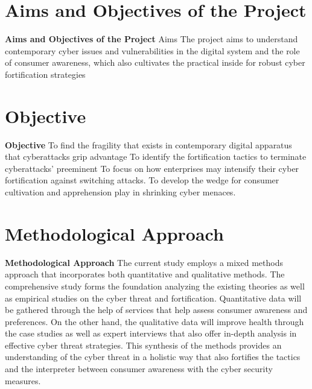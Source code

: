 
\section{Aims and Objectives of the Project}
\label{sec:into_back}
\textbf{Aims and Objectives of the Project}
Aims
The project aims to understand contemporary cyber issues and vulnerabilities in the digital system and the role of consumer awareness, which also cultivates the practical inside for robust cyber fortification strategies



\section{Objective}
\label{sec:into_back}
\textbf{Objective}
To find the fragility that exists in contemporary digital apparatus that cyberattacks grip advantage 
To identify the fortification tactics to terminate cyberattacks' preeminent
To focus on how enterprises may intensify their cyber fortification against switching attacks.
To develop the wedge for consumer cultivation and apprehension play in shrinking cyber menaces.



\section{Methodological Approach}
\label{sec:into_back}
\textbf{Methodological Approach}
The current study employs a mixed methods approach that incorporates both quantitative and qualitative methods. The comprehensive study forms the foundation analyzing the existing theories as well as empirical studies on the cyber threat and fortification. Quantitative data will be gathered through the help of services that help assess consumer awareness and preferences. On the other hand, the qualitative data will improve health through the case studies as well as expert interviews that also offer in-depth analysis in effective cyber threat strategies. This synthesis of the methods provides an understanding of the cyber threat in a holistic way that also fortifies the tactics and the interpreter between consumer awareness with the cyber security measures.


